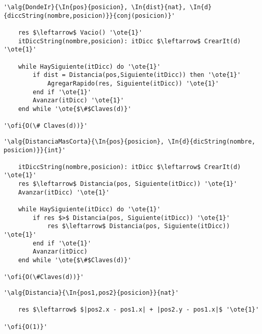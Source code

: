 \begin{lstlisting}[mathescape]
'\alg{DondeIr}{\In{pos}{posicion}, \In{dist}{nat}, \In{d}{diccString(nombre,posicion)}}{conj(posicion)}'

	res $\leftarrow$ Vacio() '\ote{1}'
	itDiccString(nombre,posicion): itDicc $\leftarrow$ CrearIt(d) '\ote{1}'

	while HaySiguiente(itDicc) do '\ote{1}'
		if dist = Distancia(pos,Siguiente(itDicc)) then '\ote{1}'
			AgregarRapido(res, Siguiente(itDicc)) '\ote{1}'
		end if '\ote{1}'
		Avanzar(itDicc) '\ote{1}'
	end while '\ote{$\#$Claves(d)}'

'\ofi{O(\# Claves(d))}'
\end{lstlisting}

\begin{lstlisting}[mathescape]
'\alg{DistanciaMasCorta}{\In{pos}{posicion}, \In{d}{dicString(nombre, posicion)}}{int}'

	itDiccString(nombre,posicion): itDicc $\leftarrow$ CrearIt(d) '\ote{1}'
	res $\leftarrow$ Distancia(pos, Siguiente(itDicc)) '\ote{1}'
	Avanzar(itDicc) '\ote{1}'

	while HaySiguiente(itDicc) do '\ote{1}'
		if res $>$ Distancia(pos, Siguiente(itDicc)) '\ote{1}'
			res $\leftarrow$ Distancia(pos, Siguiente(itDicc)) '\ote{1}'
		end if '\ote{1}'
		Avanzar(itDicc)
	end while '\ote{$\#$Claves(d)}'

'\ofi{O(\#Claves(d))}'
\end{lstlisting}

\begin{lstlisting}[mathescape]
'\alg{Distancia}{\In{pos1,pos2}{posicion}}{nat}'

	res $\leftarrow$ $|pos2.x - pos1.x| + |pos2.y - pos1.x|$ '\ote{1}'

'\ofi{O(1)}'
\end{lstlisting}

